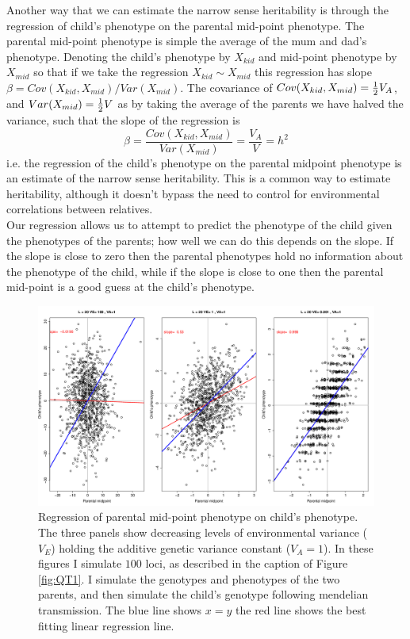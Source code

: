 Another way that we can estimate the narrow sense heritability is
through the regression of child's phenotype on the parental mid-point
phenotype. The parental mid-point phenotype is simple the average of
the mum and dad's phenotype. Denoting the child's phenotype by $X_{kid}$ and mid-point
phenotype by $X_{mid}$ so that if we take the regression $X_{kid} \sim X_{mid}$ this
regression has slope $\beta = Cov(X_{kid},X_{mid})/Var(X_{mid})$.
The covariance of $Cov(X_{kid},X_{mid})=\tfrac{1}{2}
V_A$, and $Var(X_{mid}) = \tfrac{1}{2} V$ as by taking the average of the
parents we have halved the variance, such that the slope of the
regression is
\begin{equation}
\beta= \frac{Cov(X_{kid},X_{mid})}{Var(X_{mid})} = \frac{V_A}{V} = h^2
\end{equation}
i.e. the regression of the child's phenotype on the parental midpoint
phenotype is an estimate of the narrow sense heritability. This is a
common way to estimate heritability, although it doesn't bypass the
need to control for environmental correlations between relatives. \\

Our regression allows us to attempt to predict the phenotype of the
child given the phenotypes of the parents; how well we can do this depends on the
slope. If the slope is close to zero then the parental phenotypes hold no
information about the phenotype of the child, while if the slope is
close to one then the parental mid-point is a good guess at the child's
phenotype.\\
\begin{figure}
\begin{center}
\includegraphics[width=\textwidth]{figures/QT2.png}
\end{center}
\caption{Regression of parental mid-point phenotype on child's
  phenotype. The three panels show decreasing levels of environmental
  variance ($V_E$) holding the additive genetic variance constant ($V_A=1$). 
 In these figures I simulate $100$ loci, as described in
 the caption of Figure \ref{fig:QT1}. I simulate the genotypes and
 phenotypes of the two parents, and then simulate the child's genotype
following mendelian transmission. The blue line shows $x=y$ the red
line shows the best fitting linear regression line. }
\end{figure}

